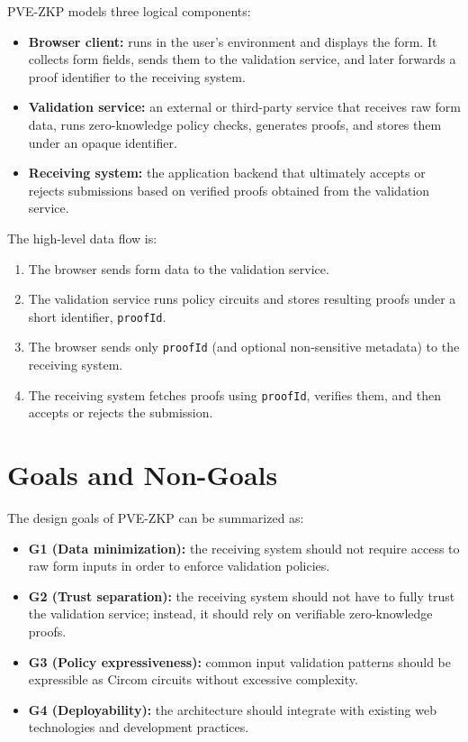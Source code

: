 PVE-ZKP models three logical components:

\begin{itemize}[leftmargin=*]
  \item \textbf{Browser client:} runs in the user's environment and displays
the form. It collects form fields, sends them to the validation service, and
later forwards a proof identifier to the receiving system.
  \item \textbf{Validation service:} an external or third-party service that
receives raw form data, runs zero-knowledge policy checks, generates proofs,
and stores them under an opaque identifier.
  \item \textbf{Receiving system:} the application backend that ultimately
accepts or rejects submissions based on verified proofs obtained from the
validation service.
\end{itemize}

The high-level data flow is:

\begin{enumerate}[leftmargin=*]
  \item The browser sends form data to the validation service.
  \item The validation service runs policy circuits and stores resulting proofs
        under a short identifier, \texttt{proofId}.
  \item The browser sends only \texttt{proofId} (and optional non-sensitive
        metadata) to the receiving system.
  \item The receiving system fetches proofs using \texttt{proofId}, verifies
        them, and then accepts or rejects the submission.
\end{enumerate}

\section{Goals and Non-Goals}

The design goals of PVE-ZKP can be summarized as:

\begin{itemize}[leftmargin=*]
  \item \textbf{G1 (Data minimization):} the receiving system should not require
    access to raw form inputs in order to enforce validation policies.
  \item \textbf{G2 (Trust separation):} the receiving system should not have to
    fully trust the validation service; instead, it should rely on verifiable
    zero-knowledge proofs.
  \item \textbf{G3 (Policy expressiveness):} common input validation patterns
    should be expressible as Circom circuits without excessive complexity.
  \item \textbf{G4 (Deployability):} the architecture should integrate with
    existing web technologies and development practices.
\end{itemize}

